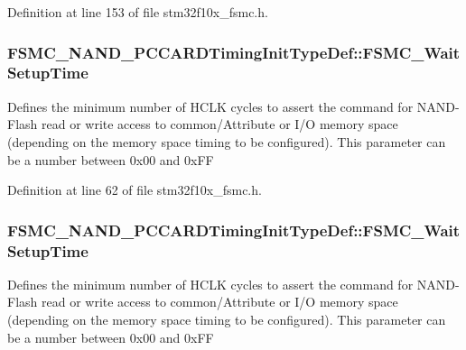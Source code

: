 Definition at line 153 of file stm32f10x\+\_\+fsmc.\+h.

\subsubsection[{\texorpdfstring{F\+S\+M\+C\+\_\+\+Wait\+Setup\+Time}{FSMC_WaitSetupTime}}]{ F\+S\+M\+C\+\_\+\+N\+A\+N\+D\+\_\+\+P\+C\+C\+A\+R\+D\+Timing\+Init\+Type\+Def\+::\+F\+S\+M\+C\+\_\+\+Wait\+Setup\+Time}\hypertarget{struct_f_s_m_c___n_a_n_d___p_c_c_a_r_d_timing_init_type_def_af703ccfa630069959b92496187c2b565}{}\label{struct_f_s_m_c___n_a_n_d___p_c_c_a_r_d_timing_init_type_def_af703ccfa630069959b92496187c2b565}
Defines the minimum number of H\+C\+LK cycles to assert the command for N\+A\+N\+D-\/\+Flash read or write access to common/\+Attribute or I/O memory space (depending on the memory space timing to be configured). This parameter can be a number between 0x00 and 0x\+FF 

Definition at line 62 of file stm32f10x\+\_\+fsmc.\+h.

\subsubsection[{\texorpdfstring{F\+S\+M\+C\+\_\+\+Wait\+Setup\+Time}{FSMC_WaitSetupTime}}]{ F\+S\+M\+C\+\_\+\+N\+A\+N\+D\+\_\+\+P\+C\+C\+A\+R\+D\+Timing\+Init\+Type\+Def\+::\+F\+S\+M\+C\+\_\+\+Wait\+Setup\+Time}\hypertarget{struct_f_s_m_c___n_a_n_d___p_c_c_a_r_d_timing_init_type_def_a99a7d54ed2674faa5a4e0f2669812855}{}\label{struct_f_s_m_c___n_a_n_d___p_c_c_a_r_d_timing_init_type_def_a99a7d54ed2674faa5a4e0f2669812855}
Defines the minimum number of H\+C\+LK cycles to assert the command for N\+A\+N\+D-\/\+Flash read or write access to common/\+Attribute or I/O memory space (depending on the memory space timing to be configured). This parameter can be a number between 0x00 and 0x\+FF 


